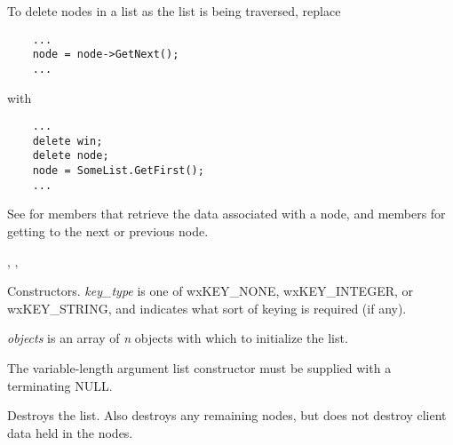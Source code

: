 To delete nodes in a list as the list is being traversed, replace

\begin{verbatim}
    ...
    node = node->GetNext();
    ...
\end{verbatim}

with

\begin{verbatim}
    ...
    delete win;
    delete node;
    node = SomeList.GetFirst();
    ...
\end{verbatim}

See  for members that retrieve the data associated with a node, and
members for getting to the next or previous node.


, ,







Constructors. {\it key\_type} is one of wxKEY\_NONE, wxKEY\_INTEGER, or wxKEY\_STRING,
and indicates what sort of keying is required (if any).

{\it objects} is an array of {\it n} objects with which to initialize the list.

The variable-length argument list constructor must be supplied with a
terminating NULL.



Destroys the list.  Also destroys any remaining nodes, but does not destroy
client data held in the nodes.

\label{wxlistappend}




